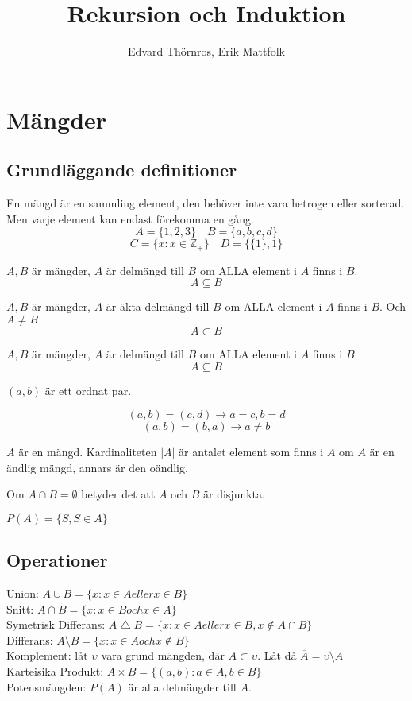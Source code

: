 \documentclass{article}
\title{Rekursion och Induktion}
\author{Edvard Thörnros, Erik Mattfolk}
\begin{document}
	\maketitle
	\newpage

	\section{Mängder}
	\subsection{Grundläggande definitioner}
	En mängd är en sammling element, den behöver inte vara hetrogen eller sorterad. Men varje element kan endast förekomma en gång.
	$$
		A = \{ 1, 2, 3 \}
		\quad
		B = \{ a, b, c, d\}
	$$
	$$
		C = \{x : x \in \mathbb{Z}_{+} \} 
		\quad
		D = \{ \{ 1 \}, 1\}
	$$

	$ A, B $ är mängder, $A$ är delmängd till $B$ om ALLA element i $A$ finns i $B$.
	$$ A \subseteq B $$

	$ A, B $ är mängder, $A$ är äkta delmängd till $B$ om ALLA element i $A$ finns i $B$. Och $A \not= B$
	$$ A \subset B $$

	$ A, B $ är mängder, $A$ är delmängd till $B$ om ALLA element i $A$ finns i $B$.
	$$ A \subseteq B $$

	$ (a, b) $ är ett ordnat par.

	$$ (a, b) = (c, d) \to a = c, b = d $$
	$$ (a, b) = (b, a) \to a \not= b $$

	$A$ är en mängd. Kardinaliteten $|A|$ är antalet element som finns i $A$ om $A$ är en ändlig mängd, annars är den oändlig.

	Om $A \cap B = \emptyset $ betyder det att $A$ och $B$ är disjunkta.
	
	\begin{center}
		$P(A) = \{S, S \in A\}$
	\end{center}

	\subsection{Operationer}
	Union: $ A \cup B = \{x : x \in A eller x \in B\} $\\
	Snitt: $ A \cap B = \{x : x \in B och x \in A\} $\\
	Symetrisk Differans: $ A \bigtriangleup B = \{x : x \in A eller x \in B, x \not\in A \cap B \} $\\
	Differans: $ A \setminus B = \{x : x \in A och x \not\in B \} $\\
	Komplement: låt $ \upsilon $ vara grund mängden, där $ A \subset \upsilon $. Låt då $ \overline{A} = \upsilon \setminus A $\\
	Karteisika Produkt: $A \times B = \{ (a, b) : a \in A, b \in B\} $\\
	Potensmängden: $P(A)$ är alla delmängder till $A$. \\
\end{document}
